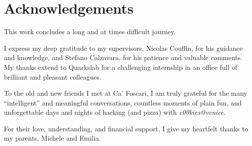 \chapter{Acknowledgements}
This work concludes a long and at times difficult journey.

I express my deep gratitude to my supervisors, Nicolas Couffin, for his guidance and knowledge, and Stefano Calzavara, for his patience and valuable comments. My thanks extend to Quarkslab for a challenging internship in an office full of brilliant and pleasant colleagues.

To the old and new friends I met at Ca' Foscari, I am truly grateful for the many \enquote{intelligent} and meaningful conversations, countless moments of plain fun, and unforgettable days and nights of hacking (and pizza) with \emph{c00kies@venice}.

For their love, understanding, and financial support, I give my heartfelt thanks to my parents, Michele and Emilia.

